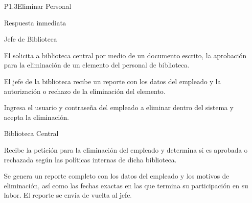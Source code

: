 \begin{Proceso}{P1.3}{Eliminar Personal}
   { %
  }

   { %
    \begin{UClist}
      \UCli Respuesta inmediata
      
    \end{UClist}
  }
   { %

  }

\end{Proceso}

\begin{PDescripcion}

  \Ppaso Jefe de Biblioteca

    \begin{enumerate}

      \Ppaso[\itarea] El  solicita a biblioteca central por medio de un documento escrito, la aprobación para la eliminación de un elemento del personal de biblioteca. 

\Ppaso[\itarea] El jefe de la biblioteca recibe un reporte con los datos del empleado y la autorización o rechazo de la eliminación del elemento.

\Ppaso[\itarea] Ingresa el usuario y contraseña del empleado a eliminar dentro del sistema y acepta la eliminación.

    \end{enumerate}
    
  \Ppaso Biblioteca Central

    \begin{enumerate}

      \Ppaso[\itarea] Recibe la petición para la eliminación del empleado y determina si es aprobada
o rechazada según las políticas internas de dicha biblioteca.

\Ppaso[\itarea] Se genera un reporte completo con los datos del empleado y los motivos de eliminación, así como las fechas exactas en las que termina su participación en su labor. El reporte se envía de vuelta al jefe.


\end{enumerate}
\end{PDescripcion}
